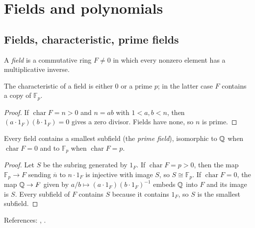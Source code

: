 \section{Fields and polynomials}\label{sec:fields-polynomials}

\subsection{Fields, characteristic, prime fields}
\begin{definition}
A \emph{field} is a commutative ring $F\neq 0$ in which every nonzero element has a multiplicative inverse.
\end{definition}
\begin{proposition}[Characteristic]\label{prop:char}
The characteristic of a field is either $0$ or a prime $p$; in the latter case $F$ contains a copy of $\mathbb{F}_p$.
\end{proposition}
\begin{proof}
If $\operatorname{char}F=n>0$ and $n=ab$ with $1<a,b<n$, then $(a\cdot1_F)(b\cdot1_F)=0$ gives a zero divisor. Fields have none, so $n$ is prime.
\end{proof}
\begin{proposition}
Every field contains a smallest subfield (the \emph{prime field}), isomorphic to $\mathbb{Q}$ when $\operatorname{char}F=0$ and to $\mathbb{F}_p$ when $\operatorname{char}F=p$.
\end{proposition}
\begin{proof}
Let $S$ be the subring generated by $1_F$. If $\operatorname{char}F=p>0$, then the map $\mathbb{F}_p\to F$ sending $\overline{n}$ to $n\cdot1_F$ is injective with image $S$, so $S\cong\mathbb{F}_p$.
If $\operatorname{char}F=0$, the map $\mathbb{Q}\to F$ given by $a/b\mapsto (a\cdot1_F)(b\cdot1_F)^{-1}$ embeds $\mathbb{Q}$ into $F$ and its image is $S$.
Every subfield of $F$ contains $S$ because it contains $1_F$, so $S$ is the smallest subfield.
\end{proof}
References: \cite[\S13]{DF}, \cite[Ch.~I]{Artin}.


